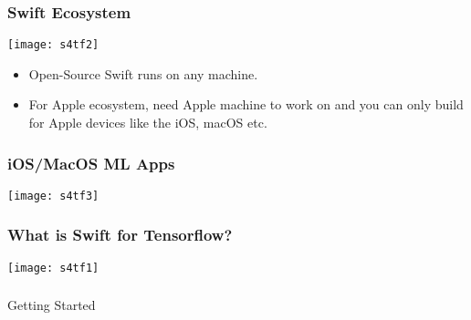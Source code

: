 \begin{frame} \frametitle{Swift Ecosystem}
\begin{center}
\texttt{[image: s4tf2]}
\end{center}

\begin{itemize}
\item Open-Source Swift runs on any machine.
\item For Apple ecosystem, need Apple machine to work on and you can only build for Apple devices like the iOS, macOS etc.
\end{itemize}

\end{frame}

\begin{frame} \frametitle{iOS/MacOS ML Apps}
\begin{center}
\texttt{[image: s4tf3]}
\end{center}
\end{frame}



\begin{frame} \frametitle{What is Swift for Tensorflow?}
\begin{center}
\texttt{[image: s4tf1]}
\end{center}
\end{frame}


\begin{frame}[fragile]\frametitle{}
\begin{center}
{\Large Getting Started}
\end{center}
\end{frame}

